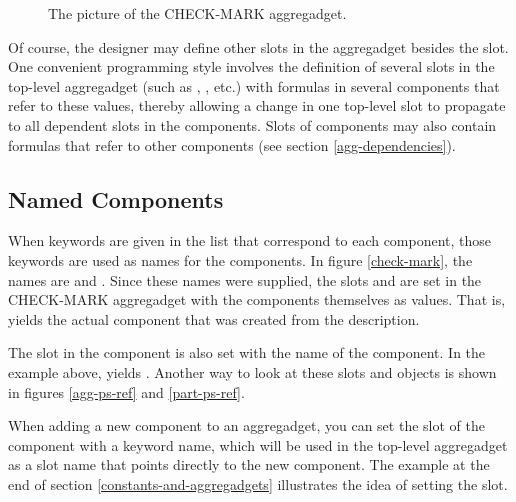 \begin{figure}
\begin{center}
\end{center}

\caption{The picture of the CHECK-MARK aggregadget.}
\end{figure}

Of course, the designer may define other slots in the aggregadget besides the
 slot.  One convenient programming style involves the
definition of several slots in the top-level aggregadget (such as
, , etc.) with formulas in several components that refer
to these values, thereby allowing a change in one top-level slot to
propagate to all dependent slots in the components.  Slots of components may
also contain formulas that refer to other components (see section
\ref{agg-dependencies}).


\subsection{Named Components}

When keywords are given in the  list that correspond to each
component, those keywords are used as names for the components.  In figure
\ref{check-mark}, the names are  and .
Since these names were supplied, the slots  and 
are set in the CHECK-MARK aggregadget with the components themselves as values.
That is,  yields the actual component that
was created from the  description.

The slot  in the component is also set with the name of the
component.  In the example above, 
yields .  Another way to look at these slots and objects is
shown in figures \ref{agg-ps-ref} and \ref{part-ps-ref}.

When adding a new component to an aggregadget, you can set the 
slot of the component with a keyword name, which will be used in the top-level
aggregadget as a slot name that points directly to the new component.  The
example at the end of section \ref{constants-and-aggregadgets} illustrates
the idea of setting the  slot.

